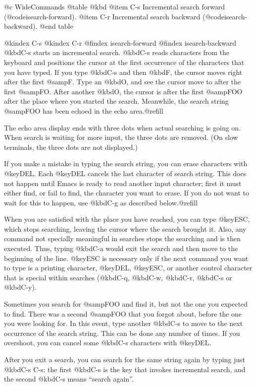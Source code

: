 {{{{{{{{@c WideCommands
@table @kbd
@item C-s
Incremental search forward (@code{isearch-forward}).
@item C-r
Incremental search backward (@code{isearch-backward}).
@end table

@kindex C-s
@kindex C-r
@findex isearch-forward
@findex isearch-backward
  @kbd{C-s} starts an incremental search.  @kbd{C-s} reads characters from
the keyboard and positions the cursor at the first occurrence of the
characters that you have typed.  If you type @kbd{C-s} and then @kbd{F},
the cursor moves right after the first @samp{F}.  Type an @kbd{O}, and see
the cursor move to after the first @samp{FO}.  After another @kbd{O}, the
cursor is after the first @samp{FOO} after the place where you started the
search.  Meanwhile, the search string @samp{FOO} has been echoed in the
echo area.@refill

  The echo area display ends with three dots when actual searching is going
on.  When search is waiting for more input, the three dots are removed.
(On slow terminals, the three dots are not displayed.)

  If you make a mistake in typing the search string, you can erase
characters with @key{DEL}.  Each @key{DEL} cancels the last character of
search string.  This does not happen until Emacs is ready to read another
input character; first it must either find, or fail to find, the character
you want to erase.  If you do not want to wait for this to happen, use
@kbd{C-g} as described below.@refill

  When you are satisfied with the place you have reached, you can type
@key{ESC}, which stops searching, leaving the cursor where the search
brought it.  Also, any command not specially meaningful in searches stops
the searching and is then executed.  Thus, typing @kbd{C-a} would exit the
search and then move to the beginning of the line.  @key{ESC} is necessary
only if the next command you want to type is a printing character,
@key{DEL}, @key{ESC}, or another control character that is special within
searches (@kbd{C-q}, @kbd{C-w}, @kbd{C-r}, @kbd{C-s} or @kbd{C-y}).

  Sometimes you search for @samp{FOO} and find it, but not the one you
expected to find.  There was a second @samp{FOO} that you forgot about,
before the one you were looking for.  In this event, type another @kbd{C-s}
to move to the next occurrence of the search string.  This can be done any
number of times.  If you overshoot, you can cancel some @kbd{C-s}
characters with @key{DEL}.

  After you exit a search, you can search for the same string again by
typing just @kbd{C-s C-s}: the first @kbd{C-s} is the key that invokes
incremental search, and the second @kbd{C-s} means ``search again''.

}}}}}}}}
